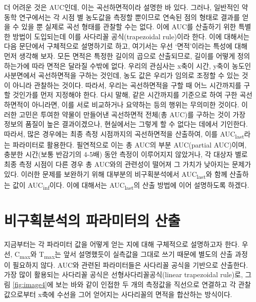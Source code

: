 \documentclass[
  11pt,
  krantz2, a4paper, twoside]{krantz}
\theoremstyle{definition}
\theoremstyle{definition}
\theoremstyle{definition}
\theoremstyle{definition}
\theoremstyle{remark}
\begin{document}
더 어려운 것은 AUC인데, 이는 곡선하면적이라 설명한 바 있다.
그러나, 일반적인 약동학 연구에서는 각 시점 별 농도값을 측정할 뿐이므로 연속된 점의 형태로 결과를 얻을 수 있을 뿐 실제로 곡선 형태를 관찰할 수는 없다. 
이에 AUC를 산출하기 위한 특별한 방법이 도입되는데 이를 사다리꼴 공식(trapezoidal rule)이라 한다.
이에 대해서는 다음 문단에서 구체적으로 설명하기로 하고, 여기서는 우선 `면적'이라는 특성에 대해 먼저 생각해 보자.
모든 면적은 특정한 길이의 곱으로 산출되므로, 길이를 어떻게 정의하는가에 따라 면적은 달라질 수밖에 없다.
우리의 관심사는 x축이 시간, y축이 농도인 사분면에서 곡선하면적을 구하는 것인데, 농도 값은 우리가 임의로 조정할 수 있는 것이 아니라 관찰하는 것이다.
따라서, 우리는 곡선하면적을 구할 때 어느 시간까지를 구할 것인가를 먼저 지정해야 한다.
다시 말해, 같은 시간까지를 기준으로 하여 구한 곡선하면적이 아니라면, 이를 서로 비교하거나 요약하는 등의 행위는 무의미한 것이다.
이러한 고민은 투여한 약물이 만들어낸 곡선하면적 전체(총 AUC)를 구하는 것이 가장 정보의 품질이 높은 결과이겠으나, 현실에서는 그렇게 할 수 없다는 데에서 기인한다.
따라서, 많은 경우에는 최종 측정 시점까지의 곡선하면적을 산출하여, 이를 AUC\textsubscript{last}라는 파라미터로 활용한다.
필연적으로 이는 총 AUC의 부분 AUC(partial AUC)이며, 충분한 시간(보통 반감기의 4-5배) 동안 측정이 이루어지지 않았거나, 각 대상자 별로 최종 측정 시점이 다른 경우 총 AUC와의 관련성이 떨어져 그 가치가 낮아지는 문제가 있다. 
이러한 문제를 보완하기 위해 대부분의 비구획분석에서 AUC\textsubscript{last}와 함께 산출하는 값이 AUC\textsubscript{inf}이다.
이에 대해서는 AUC\textsubscript{last}의 산출 방법에 이어 설명하도록 하겠다.

\hypertarget{uxbe44uxad6cuxd68duxbd84uxc11duxc758-uxd30cuxb77cuxbbf8uxd130uxc758-uxc0b0uxcd9c}{%
\section{비구획분석의 파라미터의 산출}\label{uxbe44uxad6cuxd68duxbd84uxc11duxc758-uxd30cuxb77cuxbbf8uxd130uxc758-uxc0b0uxcd9c}}

지금부터는 각 파라미터 값을 어떻게 얻는 지에 대해 구체적으로 설명하고자 한다.
우선, C\textsubscript{max}와 T\textsubscript{max}는 앞서 설명했듯이 실측값을 그대로 쓰기 때문에 별도의 산출 과정이 필요하지 않다. AUC와 관련된 파라미터들은 사다리꼴 공식을 기반으로 산출한다. 가장 많이 활용되는 사다리꼴 공식은 선형사다리꼴공식(linear trapezoidal rule)로, 그림 \ref{fig:image4}에 보는 바와 같이 인접한 두 개의 측정값을 직선으로 연결하고 각 관찰값으로부터 x축에 수선을 그어 얻어지는 사다리꼴의 면적을 합산하는 방식이다.
\end{document}
